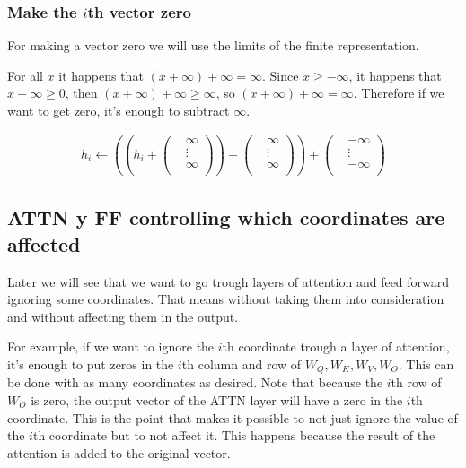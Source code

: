 \subsubsection*{Make the $i$th vector zero}

For making a vector zero we will use the limits of the finite representation.

For all $x$ it happens that $(x + \infty) + \infty = \infty$. Since $x \ge -\infty$, it happens that $x + \infty \ge 0$, then $(x + \infty) + \infty \ge \infty$, so $(x + \infty) + \infty = \infty$. Therefore if we want to get zero, it's enough to subtract $\infty$.

\begin{align*}
    h_i \leftarrow \left(\left( h_i + 
    \left(\begin{matrix}
    &\infty \\
    &\vdots \\
    &\infty \\
\end{matrix}\right)\right)
    + \left(\begin{matrix}
    &\infty \\
    &\vdots \\
    &\infty \\
\end{matrix}\right)\right)
    + \left(\begin{matrix}
    &-\infty \\
    &\vdots \\
    &-\infty \\
\end{matrix}\right)
\end{align*}


\subsection*{ATTN y FF controlling which coordinates are affected}
Later we will see that we want to go trough layers of attention and feed forward ignoring some coordinates. That means without taking them into consideration and without affecting them in the output.

For example, if we want to ignore the $i$th coordinate trough a layer of attention, it's enough to put zeros in the $i$th column and row of $W_Q, W_K, W_V, W_O$. This can be done with as many coordinates as desired. Note that because the $i$th row of $W_O$ is zero, the output vector of the ATTN layer will have a zero in the $i$th coordinate. This is the point that makes it possible to not just ignore the value of the $i$th coordinate but to not affect it. This happens because the result of the attention is added to the original vector.

